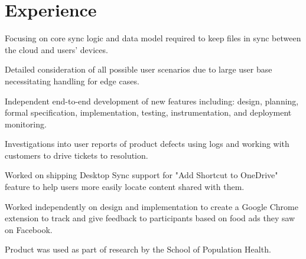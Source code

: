\documentclass[letterpaper]{deedy-resume} %
\begin{document}
\begin{minipage}[t]{0.655\textwidth} %


\section{Experience}

\vspace{\topsep} %
\begin{tightitemize}
\item Focusing on core sync logic and data model required to keep files in sync between the cloud and users' devices.
\item Detailed consideration of all possible user scenarios due to large user base necessitating handling for edge cases.
\item Independent end-to-end development of new features including: design, planning, formal specification, implementation, testing, instrumentation, and deployment monitoring.
\item Investigations into user reports of product defects using logs and working with customers to drive tickets to resolution.
\item Worked on shipping Desktop Sync support for "Add Shortcut to OneDrive" feature to help users more easily locate content shared with them.
\end{tightitemize}

\sectionspace %



\begin{tightitemize}
\item Worked independently on design and implementation to create a Google Chrome extension to track and give feedback to participants based on food ads they saw on Facebook.
\item Product was used as part of research by the School of Population Health.
\end{tightitemize}


\end{minipage}
\end{document}
